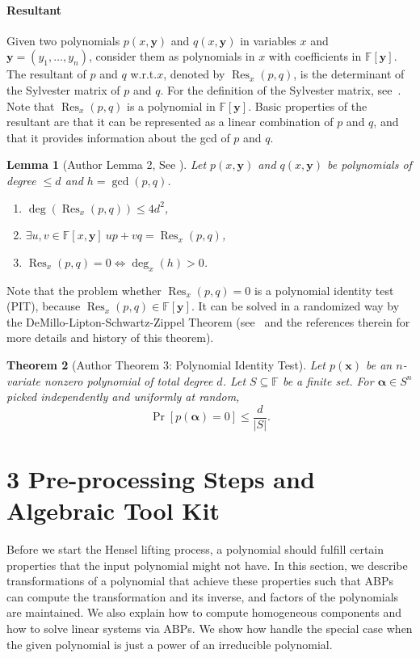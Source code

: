 \documentclass[10pt,a4paper]{article}
\newtheorem{nttheorem}{Theorem}
\newtheorem{ntlemma}[nttheorem]{Lemma}
\newcommand{\Res}{\operatorname{Res}}
\begin{document}
\paragraph{Resultant}
Given two polynomials $p(x,\mathbf y)$ and $q(x,\mathbf y)$ in variables $x$ and $\mathbf y=(y_1,\ldots,y_n)$, consider them as polynomials in $x$ with coefficients in $\mathbb F[\mathbf y]$. The resultant of $p$ and $q$ w.r.t.$x$, denoted by $\Res_x(p,q)$, is the determinant of the Sylvester matrix of $p$ and $q$. For the definition of the Sylvester matrix, see~\cite{ref20}. Note that $\Res_x(p,q)$ is a polynomial in $\mathbb F[\mathbf y]$.
Basic properties of the resultant are that it can be represented as a linear combination of $p$ and $q$, and that it provides information about the gcd of $p$ and $q$.
\setcounter{nttheorem}{1}
\begin{ntlemma}[Author Lemma 2, See {\cite{ref20}}]
Let $p(x,\mathbf y)$ and $q(x,\mathbf y)$ be polynomials of degree $\leq d$ and $h=\gcd(p,q)$.
\begin{enumerate}\item $\deg(\Res_x(p,q))\leq4d^2$,\item $\exists u,v\in\mathbb F[x,\mathbf y]\ up+vq=\Res_x(p,q)$,\item $\Res_x(p,q)=0\Longleftrightarrow\deg_x(h)>0$.\end{enumerate}
\end{ntlemma}
Note that the problem whether $\Res_x(p,q)=0$ is a polynomial identity test (PIT), because $\Res_x(p,q)\in\mathbb F[\mathbf y]$. It can be solved in a randomized way by the DeMillo-Lipton-Schwartz-Zippel Theorem (see~\cite{ref4} and the references therein for more details and history of this theorem).
\begin{nttheorem}[Author Theorem 3: Polynomial Identity Test]
Let $p(\mathbf x)$ be an $n$-variate nonzero polynomial of total degree $d$. Let $S\subseteq\mathbb F$ be a finite set. For $\boldsymbol\alpha\in S^n$ picked independently and uniformly at random,
\[\Pr[p(\boldsymbol\alpha)=0]\leq\frac d{|S|}.\]
\end{nttheorem}

\section*{3 Pre-processing Steps and Algebraic Tool Kit}
Before we start the Hensel lifting process, a polynomial should fulfill certain properties that the input polynomial might not have. In this section, we describe transformations of a polynomial that achieve these properties such that ABPs can compute the transformation and its inverse, and factors of the polynomials are maintained.
We also explain how to compute homogeneous components and how to solve linear systems via ABPs. We show how handle the special case when the given polynomial is just a power of an irreducible polynomial.
\end{document}
